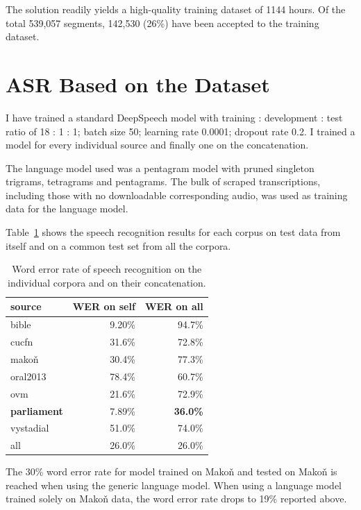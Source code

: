 \documentclass[12pt,a4paper]{report}
\begin{document}
The solution readily yields a high-quality training dataset of 1144
hours. Of the total 539,057 segments, 142,530 (26\%) have been accepted to the
training dataset.

\section{ASR Based on the Dataset}

I have trained a standard DeepSpeech model with training :
development : test ratio of 18 : 1 : 1; batch size 50; learning rate 0.0001; dropout
rate 0.2. I trained a model for every individual source and finally one on the
concatenation.

The language model used was a pentagram model with pruned singleton trigrams,
tetragrams and pentagrams. The bulk of scraped transcriptions, including those
with no downloadable corresponding audio, was used as training data for the
language model.

Table~\ref{tab:csasr:results} shows the speech recognition
results for each corpus on test data from itself and on a common test set from
all the corpora.

\begin{table}[htpb]
\caption{Word error rate of speech recognition on the individual corpora and on
their concatenation.}
\centering
\begin{tabular}{|l||r|r|}
\hline
source    & WER on self & WER on all \\
\hline
bible     & 9.20\%  & 94.7\% \\
cucfn     & 31.6\%  & 72.8\% \\
makoň     & 30.4\%  & 77.3\% \\
oral2013  & 78.4\%  & 60.7\% \\
ovm       & 21.6\%  & 72.9\% \\
\textbf{parliament}
          & 7.89\%  & \textbf{36.0\%} \\
vystadial & 51.0\%  & 74.0\% \\
\hline
all       & 26.0\% & 26.0\% \\
\hline
\end{tabular}
\label{tab:csasr:results}
\end{table}

The 30\% word error rate for model trained on Makoň and tested on Makoň is reached when using the
generic language model. When using a language model trained solely on Makoň
data, the word error rate drops to 19\% reported above.
\end{document}
